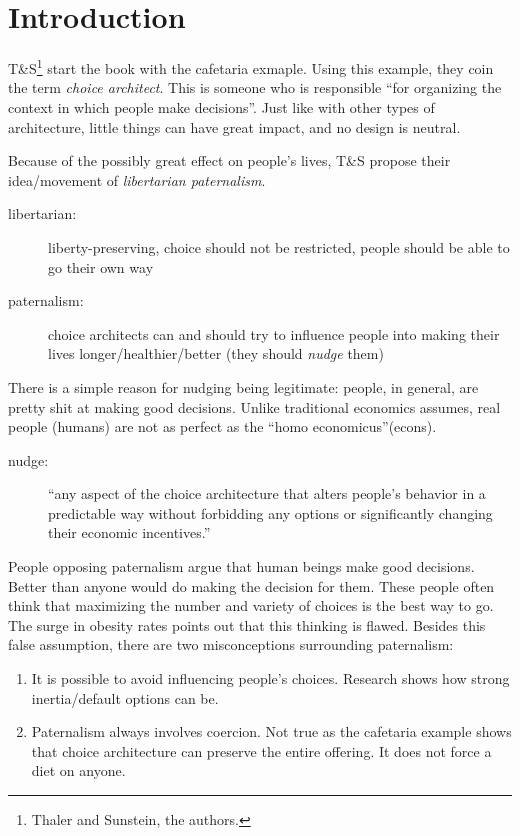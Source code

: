 \section{Introduction}

T\&S\footnote{Thaler and Sunstein, the authors.} start the book with the cafetaria exmaple. Using this example, they coin the term \emph{choice architect}. This is someone who is responsible ``for organizing the context in which people make decisions''. Just like with other types of architecture, little things can have great impact, and no design is neutral.

Because of the possibly great effect on people's lives, T\&S propose their idea/movement of \emph{libertarian paternalism}. 
\begin{description}
    \item[libertarian:] liberty-preserving, choice should not be restricted, people should be able to go their own way
    \item[paternalism:] choice architects can and should try to influence people into making their lives longer/healthier/better (they should \emph{nudge} them)
\end{description}
There is a simple reason for nudging being legitimate: people, in general, are pretty shit at making good decisions. Unlike traditional economics assumes, real people (humans) are not as perfect as the ``homo economicus''(econs).

\begin{description}
    \item[nudge:] ``any aspect of the choice architecture that alters people's behavior in a predictable way without forbidding any options or significantly changing their economic incentives.''
\end{description}

People opposing paternalism argue that human beings make good decisions. Better than anyone would do making the decision for them. These people often think that maximizing the number and variety of choices is the best way to go. The surge in obesity rates points out that this thinking is flawed. Besides this false assumption, there are two misconceptions surrounding paternalism:

\begin{enumerate}
    \item It is possible to avoid influencing people's choices. Research shows how strong inertia/default options can be.
    \item Paternalism always involves coercion. Not true as the cafetaria example shows that choice architecture can preserve the entire offering. It does not force a diet on anyone.
\end{enumerate}
